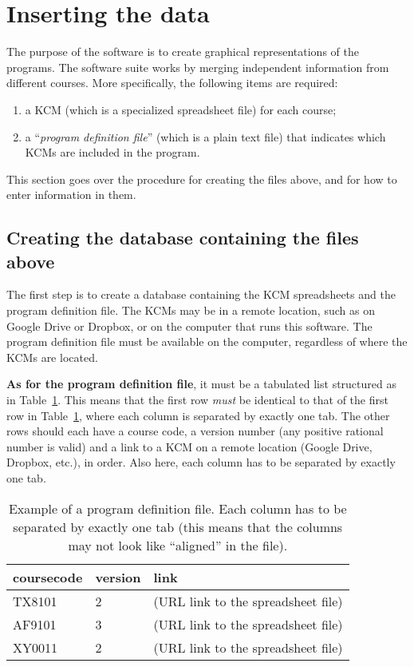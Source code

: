\section{Inserting the data}
\label{sec:inserting_the_data}

The purpose of the software is to create graphical representations of the
programs. The software suite works by merging independent information from
different courses. More specifically, the following items are required:
%
\begin{enumerate}
\item a \ac{KCM} (which is a specialized spreadsheet file) for each course;
\item a ``\emph{program definition file}'' (which is a plain text file) that
	indicates which \acp{KCM} are included in the program.
\end{enumerate}
%
This section goes over the procedure for creating the files above, and for
how to enter information in them.

\subsection{Creating the database containing the files above}
\label{creating_the_database}

The first step is to create a database containing the \ac{KCM} spreadsheets
and the program definition file. The \acp{KCM} may be in a remote location,
such as on Google Drive or Dropbox, or on the computer that runs this
software. The program definition file must be available on the computer,
regardless of where the \acp{KCM} are located.

\textbf{As for the program definition file}, it must be a tabulated list
structured as in Table~\ref{tab:progexample}. This means that the first row
\emph{must} be identical to that of the first row in
Table~\ref{tab:progexample}, where each column is separated by exactly one
tab. The other rows should each have a course code, a version number (any
positive rational number is valid) and a link to a \ac{KCM} on a remote
location (Google Drive, Dropbox, etc.), in order. Also here, each column has
to be separated by exactly one tab. 

\begin{table}[!htbp]
	\centering
	\caption{Example of a program definition file. Each column has to be
	separated by exactly one tab (this means that the columns may not
	look like ``aligned'' in the file).}
	\label{tab:progexample}
	\ttfamily
	\begin{tabular}[t]{lll}
		\toprule
			coursecode & version & link \\
		\midrule
			TX8101 & 2 & (URL link to the spreadsheet file) \\
			AF9101 & 3 & (URL link to the spreadsheet file) \\
			XY0011 & 2 & (URL link to the spreadsheet file) \\
		\bottomrule
	\end{tabular}
\end{table}

